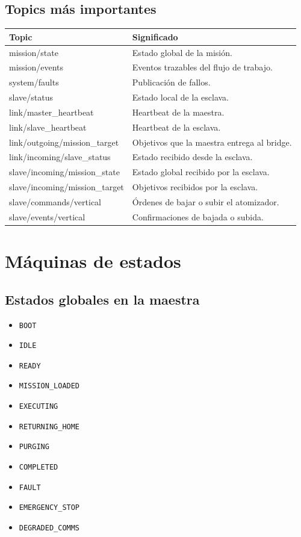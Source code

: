 \documentclass[11pt,a4paper]{article}
\begin{document}
\subsection{Topics m\'as importantes}
\begin{center}
\begin{tabularx}{\textwidth}{>{\ttfamily}l X}
\toprule
Topic & Significado \\
\midrule
mission/state & Estado global de la misi\'on. \\
mission/events & Eventos trazables del flujo de trabajo. \\
system/faults & Publicaci\'on de fallos. \\
slave/status & Estado local de la esclava. \\
link/master\_heartbeat & Heartbeat de la maestra. \\
link/slave\_heartbeat & Heartbeat de la esclava. \\
link/outgoing/mission\_target & Objetivos que la maestra entrega al bridge. \\
link/incoming/slave\_status & Estado recibido desde la esclava. \\
slave/incoming/mission\_state & Estado global recibido por la esclava. \\
slave/incoming/mission\_target & Objetivos recibidos por la esclava. \\
slave/commands/vertical & \'Ordenes de bajar o subir el atomizador. \\
slave/events/vertical & Confirmaciones de bajada o subida. \\
\bottomrule
\end{tabularx}
\end{center}

\section{M\'aquinas de estados}
\subsection{Estados globales en la maestra}
\begin{itemize}
    \item \texttt{BOOT}
    \item \texttt{IDLE}
    \item \texttt{READY}
    \item \texttt{MISSION\_LOADED}
    \item \texttt{EXECUTING}
    \item \texttt{RETURNING\_HOME}
    \item \texttt{PURGING}
    \item \texttt{COMPLETED}
    \item \texttt{FAULT}
    \item \texttt{EMERGENCY\_STOP}
    \item \texttt{DEGRADED\_COMMS}
\end{itemize}
\end{document}
